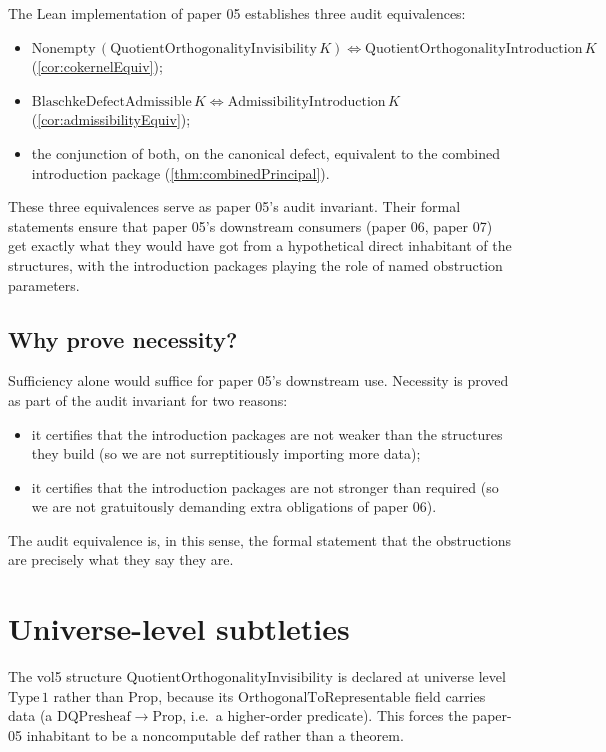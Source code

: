 \documentclass[12pt]{article}
\theoremstyle{definition}
\theoremstyle{remark}
\begin{document}
The Lean implementation of paper 05 establishes three audit equivalences:
\begin{itemize}
  \item $\mathrm{Nonempty}\,(\mathrm{QuotientOrthogonalityInvisibility}\,K) \iff \mathrm{QuotientOrthogonalityIntroduction}\,K$ (\cref{cor:cokernelEquiv});
  \item $\mathrm{BlaschkeDefectAdmissible}\,K \iff \mathrm{AdmissibilityIntroduction}\,K$ (\cref{cor:admissibilityEquiv});
  \item the conjunction of both, on the canonical defect, equivalent to the combined introduction package (\cref{thm:combinedPrincipal}).
\end{itemize}
These three equivalences serve as paper 05's audit invariant. Their formal statements ensure that paper 05's downstream consumers (paper 06, paper 07) get exactly what they would have got from a hypothetical direct inhabitant of the structures, with the introduction packages playing the role of named obstruction parameters.

\subsection{Why prove necessity?}

Sufficiency alone would suffice for paper 05's downstream use. Necessity is proved as part of the audit invariant for two reasons:
\begin{itemize}
  \item it certifies that the introduction packages are not weaker than the structures they build (so we are not surreptitiously importing more data);
  \item it certifies that the introduction packages are not stronger than required (so we are not gratuitously demanding extra obligations of paper 06).
\end{itemize}
The audit equivalence is, in this sense, the formal statement that the obstructions are precisely what they say they are.

\section{Universe-level subtleties}\label{sec:universe}

The vol5 structure $\mathrm{QuotientOrthogonalityInvisibility}$ is declared at universe level $\mathrm{Type}\,1$ rather than $\mathrm{Prop}$, because its $\mathrm{OrthogonalToRepresentable}$ field carries data (a $\mathrm{DQPresheaf} \to \mathrm{Prop}$, i.e.~a higher-order predicate). This forces the paper-05 inhabitant to be a $\mathrm{noncomputable}$ $\mathrm{def}$ rather than a $\mathrm{theorem}$.
\end{document}
